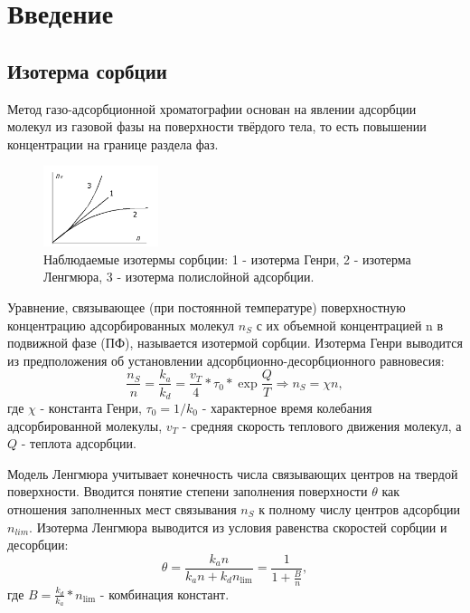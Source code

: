 \documentclass{article}
\begin{document}
\section{Введение}
\subsection{Изотерма сорбции}\;
\par Метод газо-адсорбционной хроматографии основан на явлении адсорбции молекул из газовой фазы на поверхности твёрдого тела, то есть повышении концентрации на границе раздела фаз.
\begin{figure}
    \includegraphics[width=0.3\textwidth]{Images/адсорбция.png}
    \caption{Наблюдаемые изотермы сорбции: 1 - изотерма Генри,
2 - изотерма Ленгмюра, 3 - изотерма полислойной адсорбции.}
\end{figure} \;
\par Уравнение, связывающее (при постоянной температуре) поверхностную концентрацию адсорбированных молекул $n_{S}$ с их объемной концентрацией n в подвижной фазе (ПФ), называется изотермой сорбции. Изотерма Генри выводится из предположения об установлении адсорбционно-десорбционного равновесия:
\begin{equation}
\frac{n_S}{n} = \frac{k_a}{k_d} = \frac{v_T}{4}*\tau_0 * \exp \frac{Q}{T} \Rightarrow n_S = \chi n,
\label{exp_Q}
\end{equation}
где $\chi$ - константа Генри, $\tau_0 = 1/k_0$ - характерное время колебания адсорбированной молекулы, $v_T$ - средняя скорость теплового движения молекул, а $Q$ - теплота адсорбции.
\par Модель Ленгмюра учитывает конечность числа связывающих центров на твердой поверхности. Вводится понятие степени заполнения поверхности $\theta$ как отношения заполненных мест связывания $n_S$ к полному числу центров адсорбции $n_{lim}$. Изотерма Ленгмюра выводится из условия равенства скоростей сорбции и десорбции:
\begin{equation}
\theta = \frac{k_a n}{k_a n + k_d n_{\lim}} = \frac{1}{1 + \frac{B}{n}},
\end{equation}
где $B = \frac{k_d}{k_a}*n_{\lim}$ - комбинация констант.
\end{document}
